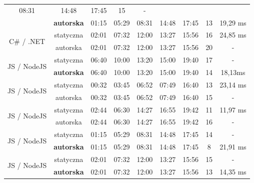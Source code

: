 \begin{table}[H]
{\begin{tabular}{|c|c|ccccc|c|c|}
  \multicolumn{1}{c|}{08:31} &
  \multicolumn{1}{c|}{14:48} &
  17:45 &
  15 &
  - \\ \cline{2-9} 
 &
  \textbf{autorska} &
  \multicolumn{1}{c|}{01:15} &
  \multicolumn{1}{c|}{05:29} &
  \multicolumn{1}{c|}{08:31} &
  \multicolumn{1}{c|}{14:48} &
  17:45 &
  13 &
  19,29 ms \\ \hline
\multirow{2}{*}{C\# / .NET} &
  statyczna &
  \multicolumn{1}{c|}{02:01} &
  \multicolumn{1}{c|}{07:32} &
  \multicolumn{1}{c|}{12:00} &
  \multicolumn{1}{c|}{13:27} &
  15:56 &
  16 &
  24,85 ms \\ \cline{2-9} 
 &
  autorska &
  \multicolumn{1}{c|}{02:01} &
  \multicolumn{1}{c|}{07:32} &
  \multicolumn{1}{c|}{12:00} &
  \multicolumn{1}{c|}{13:27} &
  15:56 &
  20 &
  - \\ \hline
\multirow{2}{*}{JS / NodeJS} &
  statyczna &
  \multicolumn{1}{c|}{06:40} &
  \multicolumn{1}{c|}{10:00} &
  \multicolumn{1}{c|}{13:20} &
  \multicolumn{1}{c|}{15:00} &
  19:40 &
  17 &
  - \\ \cline{2-9} 
 &
  \textbf{autorska} &
  \multicolumn{1}{c|}{06:40} &
  \multicolumn{1}{c|}{10:00} &
  \multicolumn{1}{c|}{13:20} &
  \multicolumn{1}{c|}{15:00} &
  19:40 &
  14 &
  18,13ms \\ \hline
\multirow{2}{*}{JS / NodeJS} &
  statyczna &
  \multicolumn{1}{c|}{00:32} &
  \multicolumn{1}{c|}{03:45} &
  \multicolumn{1}{c|}{06:52} &
  \multicolumn{1}{c|}{07:49} &
  16:40 &
  13 &
  23,14 ms \\ \cline{2-9} 
 &
  autorska &
  \multicolumn{1}{c|}{00:32} &
  \multicolumn{1}{c|}{03:45} &
  \multicolumn{1}{c|}{06:52} &
  \multicolumn{1}{c|}{07:49} &
  16:40 &
  15 &
  - \\ \hline
\multirow{2}{*}{JS / NodeJS} &
  statyczna &
  \multicolumn{1}{c|}{02:44} &
  \multicolumn{1}{c|}{06:30} &
  \multicolumn{1}{c|}{14:27} &
  \multicolumn{1}{c|}{16:55} &
  19:42 &
  11 &
  11,97 ms \\ \cline{2-9} 
 &
  autorska &
  \multicolumn{1}{c|}{02:44} &
  \multicolumn{1}{c|}{06:30} &
  \multicolumn{1}{c|}{14:27} &
  \multicolumn{1}{c|}{16:55} &
  19:42 &
  16 &
  - \\ \hline
\multirow{2}{*}{JS / NodeJS} &
  statyczna &
  \multicolumn{1}{c|}{01:15} &
  \multicolumn{1}{c|}{05:29} &
  \multicolumn{1}{c|}{08:31} &
  \multicolumn{1}{c|}{14:48} &
  17:45 &
  14 &
  - \\ \cline{2-9} 
 &
  \textbf{autorska} &
  \multicolumn{1}{c|}{01:15} &
  \multicolumn{1}{c|}{05:29} &
  \multicolumn{1}{c|}{08:31} &
  \multicolumn{1}{c|}{14:48} &
  17:45 &
  8 &
  21,91 ms \\ \hline
\multirow{2}{*}{JS / NodeJS} &
  statyczna &
  \multicolumn{1}{c|}{02:01} &
  \multicolumn{1}{c|}{07:32} &
  \multicolumn{1}{c|}{12:00} &
  \multicolumn{1}{c|}{13:27} &
  15:56 &
  15 &
  - \\ \cline{2-9} 
 &
  \textbf{autorska} &
  \multicolumn{1}{c|}{02:01} &
  \multicolumn{1}{c|}{07:32} &
  \multicolumn{1}{c|}{12:00} &
  \multicolumn{1}{c|}{13:27} &
  15:56 &
  13 &
  14,35 ms \\ \hline
\end{tabular}%
}
\end{table}

